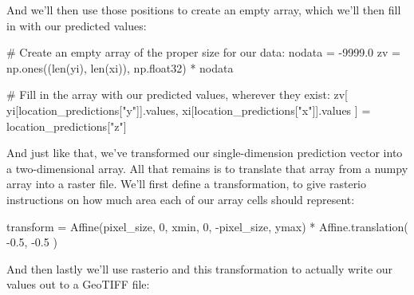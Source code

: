 \documentclass[
  letterpaper,
  DIV=11,
  numbers=noendperiod]{scrartcl}
\newenvironment{Shaded}{\begin{snugshade}}{\end{snugshade}}
\newcommand{\BuiltInTok}[1]{\textcolor[rgb]{0.00,0.23,0.31}{#1}}
\newcommand{\CommentTok}[1]{\textcolor[rgb]{0.37,0.37,0.37}{#1}}
\newcommand{\DecValTok}[1]{\textcolor[rgb]{0.68,0.00,0.00}{#1}}
\newcommand{\FloatTok}[1]{\textcolor[rgb]{0.68,0.00,0.00}{#1}}
\newcommand{\NormalTok}[1]{\textcolor[rgb]{0.00,0.23,0.31}{#1}}
\newcommand{\OperatorTok}[1]{\textcolor[rgb]{0.37,0.37,0.37}{#1}}
\newcommand{\StringTok}[1]{\textcolor[rgb]{0.13,0.47,0.30}{#1}}
\begin{document}
And we'll then use those positions to create an empty array, which we'll
then fill in with our predicted values:

\begin{Shaded}
\begin{Highlighting}[]
\CommentTok{\# Create an empty array of the proper size for our data:}
\NormalTok{nodata }\OperatorTok{=} \OperatorTok{{-}}\FloatTok{9999.0}
\NormalTok{zv }\OperatorTok{=}\NormalTok{ np.ones((}\BuiltInTok{len}\NormalTok{(yi), }\BuiltInTok{len}\NormalTok{(xi)), np.float32) }\OperatorTok{*}\NormalTok{ nodata}

\CommentTok{\# Fill in the array with our predicted values, wherever they exist:}
\NormalTok{zv[}
\NormalTok{    yi[location\_predictions[}\StringTok{"y"}\NormalTok{]].values, xi[location\_predictions[}\StringTok{"x"}\NormalTok{]].values}
\NormalTok{] }\OperatorTok{=}\NormalTok{ location\_predictions[}\StringTok{"z"}\NormalTok{]}
\end{Highlighting}
\end{Shaded}

And just like that, we've transformed our single-dimension prediction
vector into a two-dimensional array. All that remains is to translate
that array from a numpy array into a raster file. We'll first define a
transformation, to give rasterio instructions on how much area each of
our array cells should represent:

\begin{Shaded}
\begin{Highlighting}[]
\NormalTok{transform }\OperatorTok{=}\NormalTok{ Affine(pixel\_size, }\DecValTok{0}\NormalTok{, xmin, }\DecValTok{0}\NormalTok{, }\OperatorTok{{-}}\NormalTok{pixel\_size, ymax) }\OperatorTok{*}\NormalTok{ Affine.translation(}
    \OperatorTok{{-}}\FloatTok{0.5}\NormalTok{, }\OperatorTok{{-}}\FloatTok{0.5}
\NormalTok{)}
\end{Highlighting}
\end{Shaded}

And then lastly we'll use rasterio and this transformation to actually
write our values out to a GeoTIFF file:
\end{document}
